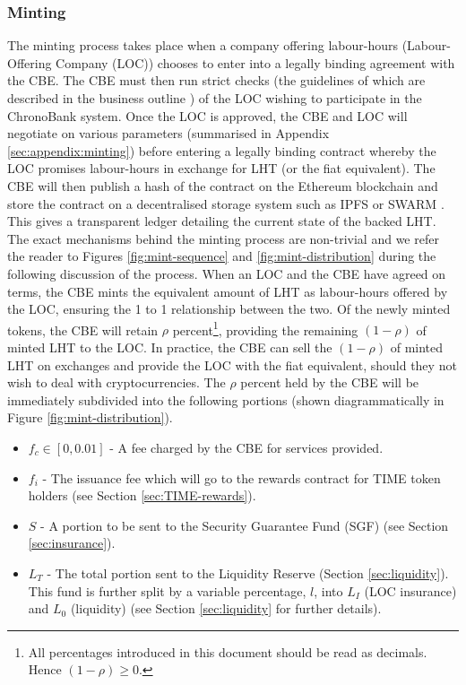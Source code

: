 \begin{multicols}{2}
\subsubsection{Minting}
\label{sec:minting}
The minting process takes place when a company offering labour-hours (Labour-Offering Company (LOC)) chooses to enter into a legally binding agreement with the CBE. The CBE must then run strict checks (the guidelines of which are described in the business outline \cite{BisOutline}) of the LOC wishing to participate in the ChronoBank system. Once the LOC is approved, the CBE and LOC will negotiate on various parameters (summarised in Appendix \ref{sec:appendix:minting}) before entering a legally binding contract whereby the LOC promises labour-hours in exchange for LHT (or the fiat equivalent). The CBE will then publish a hash of the contract on the Ethereum blockchain and store the contract on a decentralised storage system such as IPFS \cite{ipfs} or SWARM \cite{swarm}. This gives a transparent ledger detailing the current state of the backed LHT.  The exact mechanisms behind the minting process are non-trivial and we refer the reader to Figures \ref{fig:mint-sequence} and \ref{fig:mint-distribution} during the following discussion of the process. 
When an LOC and the CBE have agreed on terms, the CBE mints the equivalent amount of LHT as labour-hours offered by the LOC, ensuring the 1 to 1 relationship between the two. Of the newly minted tokens, the CBE will retain $\rho$ percent\footnote{All percentages introduced in this document should be read as decimals. Hence $(1- \rho) \ge 0$.}, providing the remaining $(1 - \rho)$ of minted LHT to the LOC. In practice, the CBE can sell the $(1-\rho)$ of minted LHT on exchanges and provide the LOC with the fiat equivalent, should they not wish to deal with cryptocurrencies. The $\rho$ percent held by the CBE will be immediately subdivided into the following portions (shown diagrammatically in Figure \ref{fig:mint-distribution}). 
\begin{itemize}
  \setlength\itemsep{2mm}
  \item $f_c \in [0,0.01]$ - A fee charged by the CBE for services provided. 
  \item $f_i$ - The issuance fee which will go to the rewards contract for TIME token holders (see Section \ref{sec:TIME-rewards}).
  \item $S$ - A portion to be sent to the Security Guarantee Fund (SGF) (see Section \ref{sec:insurance}). 
  \item $L_{T}$ - The total portion sent to the Liquidity Reserve (Section \ref{sec:liquidity}). This fund is further split by a variable percentage, $l$, into $L_I$ (LOC insurance) and $L_0$ (liquidity) (see Section \ref{sec:liquidity} for further details). 

\end{itemize}
\end{multicols}
